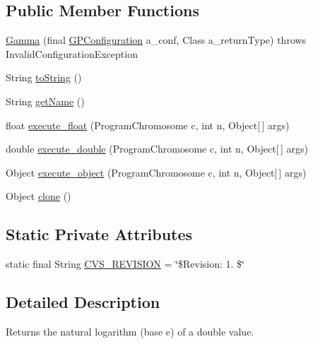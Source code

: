 \subsection*{Public Member Functions}
\begin{DoxyCompactItemize}
\item 
\hyperlink{classexamples_1_1gp_1_1symbolic_regression_1_1_gamma_a5d758ded596674072316c66de1109204}{Gamma} (final \hyperlink{classorg_1_1jgap_1_1gp_1_1impl_1_1_g_p_configuration}{G\-P\-Configuration} a\-\_\-conf, Class a\-\_\-return\-Type)  throws Invalid\-Configuration\-Exception 
\item 
String \hyperlink{classexamples_1_1gp_1_1symbolic_regression_1_1_gamma_a8fc0d7d01587554b78bb27770e6ec8b2}{to\-String} ()
\item 
String \hyperlink{classexamples_1_1gp_1_1symbolic_regression_1_1_gamma_a70dd25b790082752b5c3f8af206b3f6e}{get\-Name} ()
\item 
float \hyperlink{classexamples_1_1gp_1_1symbolic_regression_1_1_gamma_aee0a915b2f92025ac097edaa7b3fbef3}{execute\-\_\-float} (Program\-Chromosome c, int n, Object\mbox{[}$\,$\mbox{]} args)
\item 
double \hyperlink{classexamples_1_1gp_1_1symbolic_regression_1_1_gamma_a82e5893427c786aa0ed621713289f568}{execute\-\_\-double} (Program\-Chromosome c, int n, Object\mbox{[}$\,$\mbox{]} args)
\item 
Object \hyperlink{classexamples_1_1gp_1_1symbolic_regression_1_1_gamma_a48f730b73fdbfffddc744ee56545c86d}{execute\-\_\-object} (Program\-Chromosome c, int n, Object\mbox{[}$\,$\mbox{]} args)
\item 
Object \hyperlink{classexamples_1_1gp_1_1symbolic_regression_1_1_gamma_a75e2c1de7577c1bfda82882781b8d0ca}{clone} ()
\end{DoxyCompactItemize}
\subsection*{Static Private Attributes}
\begin{DoxyCompactItemize}
\item 
static final String \hyperlink{classexamples_1_1gp_1_1symbolic_regression_1_1_gamma_a2e446473c391d3b33464ddabd889c19f}{C\-V\-S\-\_\-\-R\-E\-V\-I\-S\-I\-O\-N} = \char`\"{}\$Revision\-: 1. \$\char`\"{}
\end{DoxyCompactItemize}


\subsection{Detailed Description}
Returns the natural logarithm (base e) of a double value.

